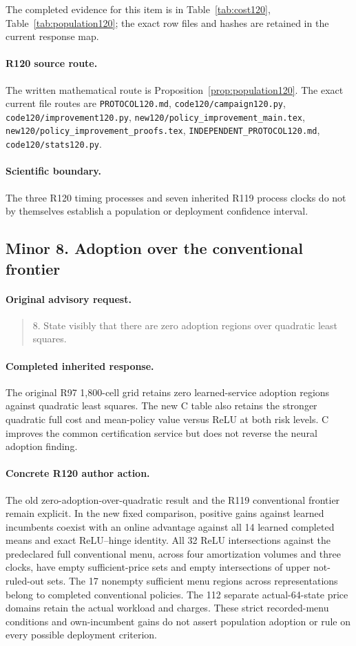The completed evidence for this item is in Table~\ref{tab:cost120}, Table~\ref{tab:population120}; the exact row files and hashes are retained in the current response map.
\paragraph{R120 source route.}
The written mathematical route is Proposition~\ref{prop:population120}. The exact current file routes are \nolinkurl{PROTOCOL120.md}, \nolinkurl{code120/campaign120.py}, \nolinkurl{code120/improvement120.py}, \nolinkurl{new120/policy_improvement_main.tex}, \nolinkurl{new120/policy_improvement_proofs.tex}, \nolinkurl{INDEPENDENT_PROTOCOL120.md}, \nolinkurl{code120/stats120.py}.
\paragraph{Scientific boundary.}
The three R120 timing processes and seven inherited R119 process clocks do not by themselves establish a population or deployment confidence interval.

\subsection{Minor 8. Adoption over the conventional frontier}
\label{response120:minor-8}
\paragraph{Original advisory request.}
\begin{quote}
8. State visibly that there are zero adoption regions over quadratic least squares.
\end{quote}
\paragraph{Completed inherited response.}
The original R97 1,800-cell grid retains zero learned-service adoption regions against quadratic least squares. The new C table also retains the stronger quadratic full cost and mean-policy value versus ReLU at both risk levels. C improves the common certification service but does not reverse the neural adoption finding.
\paragraph{Concrete R120 author action.}
The old zero-adoption-over-quadratic result and the R119 conventional frontier remain explicit. In the new fixed comparison, positive gains against learned incumbents coexist with an online advantage against all 14 learned completed means and exact ReLU--hinge identity. All 32 ReLU intersections against the predeclared full conventional menu, across four amortization volumes and three clocks, have empty sufficient-price sets and empty intersections of upper not-ruled-out sets. The 17 nonempty sufficient menu regions across representations belong to completed conventional policies. The 112 separate actual-64-state price domains retain the actual workload and charges. These strict recorded-menu conditions and own-incumbent gains do not assert population adoption or rule on every possible deployment criterion.

